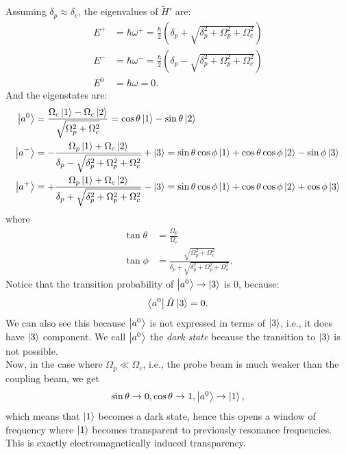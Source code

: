 \documentclass{article}
\theoremstyle{definition}
\begin{document}
Assuming $\delta_p \approx \delta_c$, the eigenvalues of $\tilde{H}'$ are:
\begin{align}
E^+ &= \hbar\omega^+ = \frac{\hbar}{2}\left( \delta_p + \sqrt{\delta^2_p + \Omega^2_p + \Omega^2_c}\right) \nonumber\\
E^- &= \hbar\omega^- = \frac{\hbar}{2}\left( \delta_p - \sqrt{\delta^2_p + \Omega^2_p + \Omega^2_c}\right) \nonumber\\
E^0 &= \hbar\omega = 0.
\end{align}
And the eigenstates are:
\begin{align}
\ket{a^0} &= \frac{\Omega_c\ket{1} - \Omega_c\ket{2}}{\sqrt{\Omega^2_p + \Omega^2_c}} = \cos\theta\ket{1} - \sin\theta\ket{2}\nonumber\\
\ket{a^-} &= -\frac{\Omega_p\ket{1} + \Omega_c\ket{2}}{\delta_p - \sqrt{\delta^2_p + \Omega^2_p + \Omega^2_c}} +\ket{3} = \sin\theta\cos\phi\ket{1} + \cos\theta \cos \phi \ket{2} - \sin\phi\ket{3}\nonumber\\
\ket{a^+} &= +\frac{\Omega_p\ket{1} + \Omega_c\ket{2}}{\delta_p + \sqrt{\delta^2_p + \Omega^2_p + \Omega^2_c}} -\ket{3} = \sin\theta\cos\phi\ket{1} + \cos\theta \cos \phi \ket{2} + \cos\phi\ket{3}
\end{align}
where 
\begin{align}
\tan\theta &= \frac{\Omega_p}{\Omega_c}\\
\tan\phi &= \frac{\sqrt{\Omega^2_p+\Omega^2_c}}{\delta_p +  \sqrt{\delta^2_p + \Omega^2_p + \Omega^2_c}}.
\end{align}
Notice that the transition probability of $\ket{a^0} \rightarrow \ket{3}$ is 0, because:
\begin{align}
\bra{a^0}\hat{H}\ket{3} = 0.
\end{align}
We can also see this because $\ket{a^0}$ is not expressed in terms of $\ket{3}$, i.e., it does have $\ket{3}$ component. We call $\ket{a^0}$ the \textit{dark state} because the transition to $\ket{3}$ is not possible.\\

Now, in the case where $\Omega_p \ll \Omega_c$, i.e., the probe beam is much weaker than the coupling beam, we get
\begin{align}
\sin\theta \rightarrow 0, \cos\theta \rightarrow 1, \ket{a^0} \rightarrow \ket{1},
\end{align}
which means that $\ket{1}$ becomes a dark state, hence this opens a window of frequency where $\ket{1}$ becomes transparent to previously resonance frequencies. This is exactly electromagnetically induced transparency.
\end{document}
